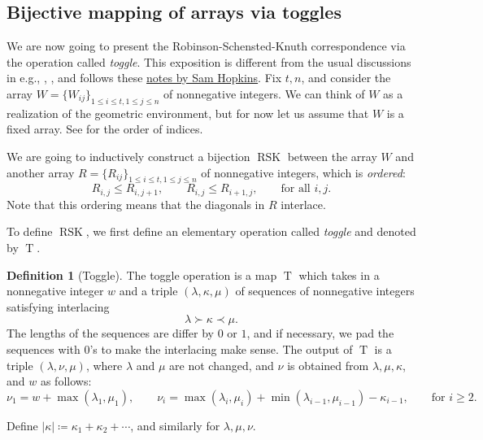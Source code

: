 \documentclass[letterpaper,11pt,oneside,reqno]{book}
\numberwithin{equation}{chapter}  %
\theoremstyle{definition}
\newtheorem{definition}[proposition]{Definition}
\begin{document}
\subsection{Bijective mapping of arrays via toggles}
\label{lecture13:sub:toggle}

We are now going to present the Robinson-Schensted-Knuth
correspondence via the operation called \emph{toggle}.
This exposition is different from the usual discussions in e.g.,
\cite{sagan2001symmetric}, \cite{fulton1997young},
and follows these \href{https://www.samuelfhopkins.com/docs/rsk.pdf}{notes by Sam Hopkins}.
Fix $t,n$, and consider the array $W=\{W_{ij}\}_{1\le i\le t, 1\le j\le n}$ of
nonnegative integers. We can think of $W$ as a realization of the geometric
environment, but for now let us assume that $W$ is a fixed array. See
 for the order of indices.

We are going to inductively construct a bijection $\operatorname{RSK}$ between the array $W$ and another
array $R=\{R_{ij}\}_{1\le i\le t, 1\le j\le n}$ of nonnegative integers, which is
\emph{ordered}:
\begin{equation*}
	R_{i,j} \le R_{i,j+1}, \qquad R_{i,j} \le R_{i+1,j},\qquad \text{for all } i,j.
\end{equation*}
Note that this ordering means that the diagonals in $R$ interlace.

To define $\operatorname{RSK}$, we first define an elementary
operation called \emph{toggle} and denoted by $\operatorname{T}$.

\begin{definition}[Toggle]
	The toggle operation is a map $\operatorname{T}$ which takes in
	a nonnegative integer $w$ and
	a triple $(\lambda,\kappa,\mu)$ of sequences of nonnegative integers
	satisfying interlacing
	\begin{equation*}
		\lambda\succ \kappa\prec \mu.
	\end{equation*}
	The lengths of the sequences are differ by $0$ or $1$, and if necessary, we pad the
	sequences with $0$'s to make the interlacing make sense.
	The output of $\operatorname{T}$ is a triple $(\lambda,\nu,\mu)$, where
	$\lambda$ and $\mu$ are not changed, and $\nu$ is obtained from $\lambda,\mu,\kappa$,
	and $w$ as follows:
	\begin{equation*}
		\nu_1=w+\max(\lambda_1,\mu_1),\qquad
		\nu_i=\max(\lambda_{i},\mu_i)+\min(\lambda_{i-1},\mu_{i-1})-\kappa_{i-1},\qquad
		\text{for } i\ge 2.
	\end{equation*}
\end{definition}
Define $|\kappa|\coloneqq \kappa_1+\kappa_2+\cdots$, and similarly for
$\lambda,\mu,\nu$.
\end{document}

